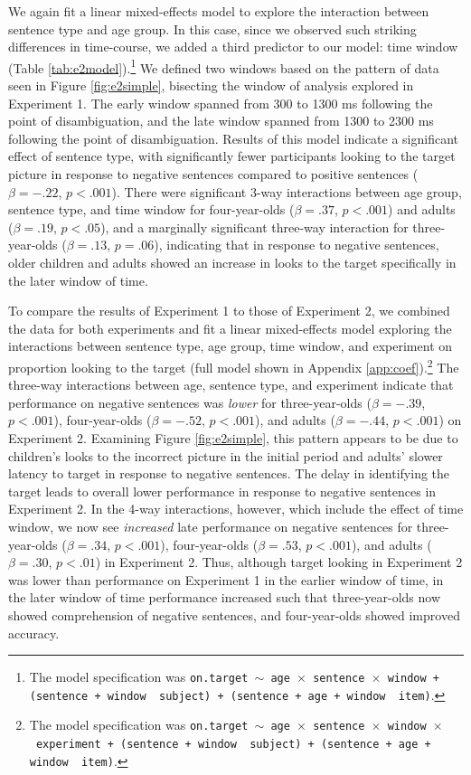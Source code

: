 \documentclass[man]{apa2}
\begin{document}
We again fit a linear mixed-effects model to explore the interaction between sentence type and age group. In this case, since we observed such striking differences in time-course, we added a third predictor to our model: time window (Table \ref{tab:e2model}).\footnote{The model specification was \texttt{on.target $\sim$ age~$\times$~sentence~$\times$~window + (sentence + window~\textbar~subject) +  (sentence + age + window~\textbar~item)}.} We defined two windows based on the pattern of data seen in Figure \ref{fig:e2simple}, bisecting the window of analysis explored in Experiment 1. The early window spanned from 300 to 1300 ms following the point of disambiguation, and the late window spanned from 1300 to 2300 ms following the point of disambiguation. Results of this model indicate a significant effect of sentence type, with significantly fewer participants looking to the target picture in response to negative sentences compared to positive sentences ($\beta = -.22$, $p < .001$).   There were significant 3-way interactions between age group, sentence type, and time window for four-year-olds ($\beta = .37$, $p  < .001$) and adults  ($\beta = .19$, $p <.05$), and a marginally significant three-way interaction for three-year-olds ($\beta = .13$, $p =.06$), indicating that in response to negative sentences, older children and adults showed an increase in looks to the target specifically in the later window of time. 

To compare the results of Experiment 1 to those of Experiment 2, we combined the data for both experiments and fit a linear mixed-effects model exploring the interactions between sentence type, age group, time window, and experiment on proportion looking to the target (full model shown in Appendix \ref{app:coef}).\footnote{The model specification was \texttt{on.target $\sim$ age~$\times$~sentence~$\times$~window~$\times$~experiment + (sentence + window~\textbar~subject) +  (sentence + age + window~\textbar~item)}.} The three-way interactions between age, sentence type, and experiment indicate that performance on negative sentences was \emph{lower} for three-year-olds ($\beta = - .39$, $p  < .001$), four-year-olds ($\beta = -.52$, $p <  .001$), and adults ($\beta = -.44$, $p  < .001$) on Experiment 2.  Examining Figure \ref{fig:e2simple}, this pattern appears to be due to children's looks to the incorrect picture in the initial period and adults' slower latency to target in response to negative sentences.  The delay in identifying the target leads to overall lower performance in response to negative sentences in Experiment 2.  In the 4-way interactions, however, which include the effect of time window, we now see \emph{increased} late performance on negative sentences for three-year-olds ($\beta = .34$, $p < .001$), four-year-olds ($\beta = .53$, $p < .001$), and adults ($\beta = .30$, $p <  .01$) in Experiment 2.  Thus, although target looking in Experiment 2 was lower than performance on Experiment 1 in the earlier window of time, in the later window of time performance increased such that three-year-olds now showed comprehension of negative sentences, and four-year-olds showed improved accuracy.  
\end{document}
